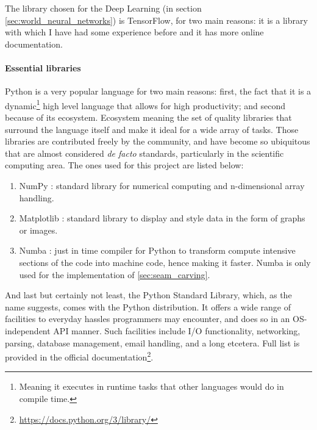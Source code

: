 \documentclass[../main.tex]{subfiles}
\begin{document}
The library chosen for the Deep Learning (in section \ref{sec:world_neural_networks}) is TensorFlow, for two main reasons: it is a library with which I have had some experience before and it has more online documentation.

\paragraph{Essential libraries} 
Python is a very popular language for two main reasons: first, the fact that it is a dynamic\footnote{Meaning it executes in runtime tasks that other languages would do in compile time.} high level language that allows for high productivity; and second because of its ecosystem. Ecosystem meaning the set of quality libraries that surround the language itself and make it ideal for a wide array of tasks. Those libraries are contributed freely by the community, and have become so ubiquitous that are almost considered \emph{de facto} standards, particularly in the scientific computing area. The ones used for this project are listed below:
\begin{enumerate}
    \item NumPy \cite{harris2020array}: standard library for numerical computing and n-dimensional array handling.
    \item Matplotlib \cite{matplotlib_paper}: standard library to display and style data in the form of graphs or images.
    \item Numba \cite{numba_paper}: just in time compiler for Python to transform compute intensive sections of the code into machine code, hence making it faster. Numba is only used for the implementation of \ref{sec:seam_carving}.
\end{enumerate}

And last but certainly not least, the Python Standard Library, which, as the name suggests, comes with the Python distribution. It offers a wide range of facilities to everyday hassles programmers may encounter, and does so in an OS-independent API manner. Such facilities include I/O functionality, networking, parsing, database management, email handling, and a long etcetera. Full list is provided in the official documentation\footnote{\url{https://docs.python.org/3/library/}}.

 
\end{document}
